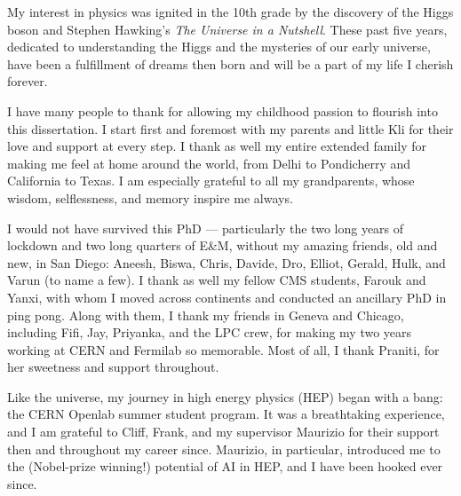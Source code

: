 \begin{acknowledgements}




My interest in physics was ignited in the 10th grade by the discovery of the Higgs boson and Stephen Hawking's \textit{The Universe in a Nutshell}. 
These past five years, dedicated to understanding the Higgs and the mysteries of our early universe, have been a fulfillment of dreams then born and will be a part of my life I cherish forever.

I have many people to thank for allowing my childhood passion to flourish into this dissertation.
I start first and foremost with my parents and little Kli for their love and support at every step.
I thank as well my entire extended family for making me feel at home around the world, from Delhi to Pondicherry and California to Texas.
I am especially grateful to all my grandparents, whose wisdom, selflessness, and memory inspire me always.

I would not have survived this PhD --- particularly the two long years of lockdown and two long quarters of E\&M, without my amazing friends, old and new, in San Diego: Aneesh, Biswa, Chris, Davide, Dro, Elliot, Gerald, Hulk, and Varun (to name a few).
I thank as well my fellow CMS students, Farouk and Yanxi, with whom I moved across continents and conducted an ancillary PhD in ping pong.
Along with them, I thank my friends in Geneva and Chicago, including Fifi, Jay, Priyanka, and the LPC crew, for making my two years working at CERN and Fermilab so memorable.
Most of all, I thank Praniti, for her sweetness and support throughout.

Like the universe, my journey in high energy physics (HEP) began with a bang: the CERN Openlab summer student program.
It was a breathtaking experience, and I am grateful to Cliff, Frank, and my supervisor Maurizio for their support then and throughout my career since.
Maurizio, in particular, introduced me to the (Nobel-prize winning!) potential of AI in HEP, and I have been hooked ever since.


\end{acknowledgements}
